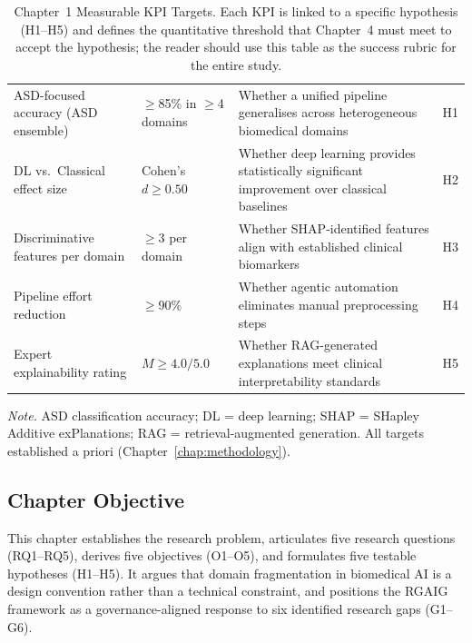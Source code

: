 {\tablestripes\tablefontsize
{}
\begin{xltabular}{\textwidth}{@{} >{\raggedright\arraybackslash}p{3cm} >{\raggedright\arraybackslash}p{2.2cm} L >{\raggedright\arraybackslash}p{1.2cm} @{}}
\caption[Chapter~1 Measurable KPI Targets]{Chapter~1 Measurable KPI Targets. Each KPI is linked to a specific hypothesis (H1--H5) and defines the quantitative threshold that Chapter~4 must meet to accept the hypothesis; the reader should use this table as the success rubric for the entire study.}\label{tab:ch1_kpi_targets} \\
\toprule
{} &  &  &  \\
\midrule
\endfirsthead
\endhead
\bottomrule
\endlastfoot
ASD-focused accuracy (ASD ensemble) & $\geq$85\% in $\geq$4 domains & Whether a unified pipeline generalises across heterogeneous biomedical domains & H1 \\
\addlinespace
DL vs.\ Classical effect size & Cohen's $d \geq 0.50$ & Whether deep learning provides statistically significant improvement over classical baselines & H2 \\
\addlinespace
Discriminative features per domain & $\geq$3 per domain & Whether SHAP-identified features align with established clinical biomarkers & H3 \\
\addlinespace
Pipeline effort reduction & $\geq$90\% & Whether agentic automation eliminates manual preprocessing steps & H4 \\
\addlinespace
Expert explainability rating & $M \geq 4.0/5.0$ & Whether RAG-generated explanations meet clinical interpretability standards & H5 \\
\end{xltabular}}
\vspace{0.5em}
\noindent\textit{Note.} ASD classification accuracy; DL = deep learning; SHAP = SHapley Additive exPlanations; RAG = retrieval-augmented generation. All targets established a priori (Chapter~\ref{chap:methodology}).

\subsection{Chapter Objective}

This chapter establishes the research problem, articulates five research questions (RQ1--RQ5), derives five objectives (O1--O5), and formulates five testable hypotheses (H1--H5). It argues that domain fragmentation in biomedical AI is a design convention rather than a technical constraint, and positions the RGAIG framework as a governance-aligned response to six identified research gaps (G1--G6).

